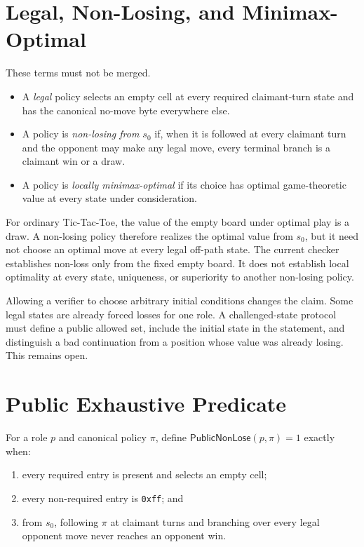 \section{Legal, Non-Losing, and Minimax-Optimal}
\label{sec:ttt-policy-properties}

These terms must not be merged.

\begin{itemize}
    \item A \emph{legal} policy selects an empty cell at every required
    claimant-turn state and has the canonical no-move byte everywhere else.
    \item A policy is \emph{non-losing from $s_0$} if, when it is followed
    at every claimant turn and the opponent may make any legal move, every
    terminal branch is a claimant win or a draw.
    \item A policy is \emph{locally minimax-optimal} if its choice has optimal
    game-theoretic value at every state under consideration.
\end{itemize}

For ordinary Tic-Tac-Toe, the value of the empty board under optimal play is a
draw. A non-losing policy therefore realizes the optimal value from $s_0$,
but it need not choose an optimal move at every legal off-path state. The
current checker establishes non-loss only from the fixed empty board. It does
not establish local optimality at every state, uniqueness, or superiority to
another non-losing policy.

Allowing a verifier to choose arbitrary initial conditions changes the claim.
Some legal states are already forced losses for one role. A challenged-state
protocol must define a public allowed set, include the initial state in the
statement, and distinguish a bad continuation from a position whose value was
already losing. This remains open.

\section{Public Exhaustive Predicate}
\label{sec:ttt-public-predicate}
\label{def:ttt-public-nonlose}

For a role $p$ and canonical policy $\pi$, define
$\mathsf{PublicNonLose}(p,\pi)=1$ exactly when:

\begin{enumerate}
    \item every required entry is present and selects an empty cell;
    \item every non-required entry is \texttt{0xff}; and
    \item from $s_0$, following $\pi$ at claimant turns and branching over
    every legal opponent move never reaches an opponent win.
\end{enumerate}

